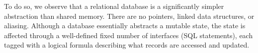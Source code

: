


To do so, we observe that a relational database is a significantly
simpler abstraction than shared memory. There are no pointers, linked
data structures, or aliasing.  Although a database essentially
abstracts a mutable state, the state is affected through a
well-defined fixed number of interfaces (SQL statements), each tagged
with a logical formula describing what records are accessed and
updated.

